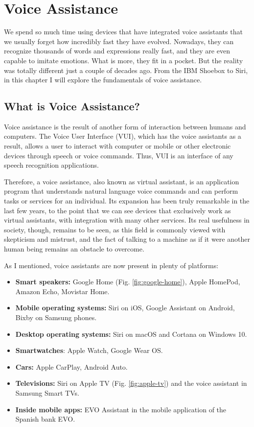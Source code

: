 \chapter{Voice Assistance}

We spend so much time using devices that have integrated voice assistants that we usually forget how incredibly fast they have
evolved. Nowadays, they can recognize thousands of words and expressions really fast, and they are even capable to imitate
emotions. What is more, they fit in a pocket. But the reality was totally different just a couple of decades ago. From the IBM
Shoebox to Siri, in this chapter I will explore the fundamentals of voice assistance.

\section{What is Voice Assistance?}
Voice assistance is the result of another form of interaction between humans and computers.\cite{botsocietyVUI} The Voice User
Interface (VUI), which has the voice assistants as a result, allows a user to interact with computer or mobile or other electronic 
devices through speech or voice commands. Thus, VUI is an interface of any speech recognition applications.

Therefore, a voice assistance, also known as virtual assistant, is an application program that understands natural language voice 
commands and can perform tasks or services for an individual. Its expansion has been truly remarkable in the last few years, to the
point that we can see devices that exclusively work as virtual assistants, with integration with many other services. Its real usefulness
in society, though, remains to be seen, as this field is commonly viewed with skepticism and mistrust, and the fact of talking to a 
machine as if it were another human being remains an obstacle to overcome.

As I mentioned, voice assistants are now present in plenty of platforms:
\begin{itemize}
	\item \textbf{Smart speakers:} Google Home (Fig. \ref{fig:google-home}), Apple HomePod, Amazon Echo, Movistar Home.
	\item \textbf{Mobile operating systems:} Siri on iOS, Google Assistant on Android, Bixby on Samsung phones.
	\item \textbf{Desktop operating systems:} Siri on macOS and Cortana on Windows 10.
	\item \textbf{Smartwatches}: Apple Watch, Google Wear OS.
	\item \textbf{Cars:} Apple CarPlay, Android Auto. 
	\item \textbf{Televisions:} Siri on Apple TV (Fig. \ref{fig:apple-tv}) and the voice assistant in Samsung Smart TVs.
	\item \textbf{Inside mobile apps:} EVO Assistant in the mobile application of the Spanish bank EVO.
\end{itemize}

